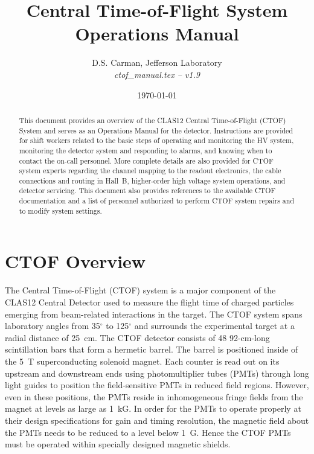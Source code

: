 \documentclass[12pt]{article}
\begin{document}
\title{Central Time-of-Flight System Operations Manual}

\vskip 0.5cm

\author{D.S. Carman, Jefferson Laboratory\\[0.2ex]
{\it ctof\_manual.tex -- v1.9}}

\date \today
%
\maketitle

\begin{abstract}
  This document provides an overview of the CLAS12 Central Time-of-Flight (CTOF) System and serves
  as an Operations Manual for the detector. Instructions are provided for shift workers related to the
  basic steps of operating and monitoring the HV system, monitoring the detector system and responding
  to alarms, and knowing when to contact the on-call personnel. More complete details are also provided
  for CTOF system experts regarding the channel mapping to the readout electronics, the cable
  connections and routing in Hall~B, higher-order high voltage system operations, and detector servicing.
  This document also provides references to the available CTOF documentation and a list of personnel
  authorized to perform CTOF system repairs and to modify system settings.
\end{abstract}

\thispagestyle{empty}

\clearpage

\vfil
\eject

\tableofcontents

\vfil
\eject

\section{CTOF Overview}
\label{intro}

The Central Time-of-Flight (CTOF) system is a major component of the CLAS12 Central Detector used to
measure the flight time of charged particles emerging from beam-related interactions in the target. The
CTOF system spans laboratory angles from 35$^\circ$ to 125$^\circ$ and surrounds the experimental
target at a radial distance of 25~cm. The CTOF detector consists of 48 92-cm-long scintillation bars that
form a hermetic barrel. The barrel is positioned inside of the 5~T superconducting solenoid magnet. Each
counter is read out on its upstream and downstream ends using photomultiplier tubes (PMTs) through long
light guides to position the field-sensitive PMTs in reduced field regions. However, even in these positions,
the PMTs reside in inhomogeneous fringe fields from the magnet at levels as large as 1~kG. In order for
the PMTs to operate properly at their design specifications for gain and timing resolution, the magnetic
field about the PMTs needs to be reduced to a level below 1~G. Hence the CTOF PMTs must be operated 
within specially designed magnetic shields.
\end{document}
